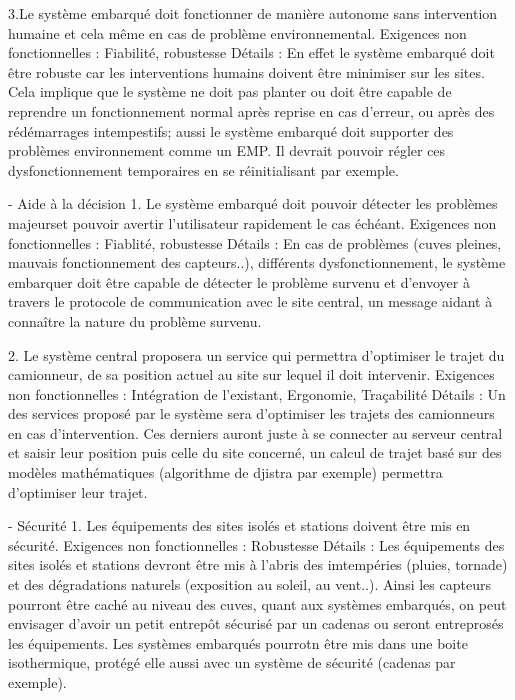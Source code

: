 3.Le système embarqué doit fonctionner de manière autonome sans intervention humaine et cela même en cas de problème
environnemental.
Exigences non fonctionnelles : Fiabilité, robustesse
Détails : En effet le système embarqué doit être robuste car les interventions humains doivent être minimiser sur
les sites. Cela implique que le système ne doit pas planter ou doit être capable de reprendre un fonctionnement normal
après reprise en cas d'erreur, ou après des rédémarrages intempestifs; aussi le système embarqué doit supporter des 
problèmes environnement comme un EMP. Il devrait pouvoir régler ces dysfonctionnement temporaires en se 
réinitialisant par exemple.


- Aide à la décision
1. Le système embarqué doit pouvoir détecter les problèmes majeurset pouvoir avertir l'utilisateur rapidement le cas
échéant.
Exigences non fonctionnelles : Fiablité, robustesse
Détails : En cas de problèmes (cuves pleines, mauvais fonctionnement des capteurs..), différents dysfonctionnement,
le système embarquer doit être capable de détecter le problème survenu et d'envoyer à travers le protocole de
communication avec le site central, un message aidant à connaître la nature du problème survenu.

2. Le système central proposera un service qui permettra d'optimiser le trajet du camionneur, de sa position
actuel au site sur lequel il doit intervenir.
Exigences non fonctionnelles : Intégration de l'existant, Ergonomie, Traçabilité
Détails : Un des services proposé par le système sera d'optimiser les trajets des camionneurs en cas d'intervention.
Ces derniers auront juste à se connecter au serveur central et saisir leur position puis celle du site concerné,
un calcul de trajet basé sur des modèles mathématiques (algorithme de djistra par exemple) permettra d'optimiser 
leur trajet.

- Sécurité
1. Les équipements des sites isolés et stations doivent être mis en sécurité.
Exigences non fonctionnelles : Robustesse
Détails : Les équipements des sites isolés et stations devront être mis à l'abris des imtempéries (pluies, tornade) 
et des dégradations naturels (exposition au soleil, au vent..). Ainsi les capteurs pourront être caché au niveau 
des cuves, quant aux systèmes embarqués, on peut envisager d'avoir un petit entrepôt sécurisé par un cadenas ou 
seront entreprosés les équipements. Les systèmes embarqués pourrotn être mis dans une boite isothermique, 
protégé elle aussi avec un système de sécurité (cadenas par exemple).


